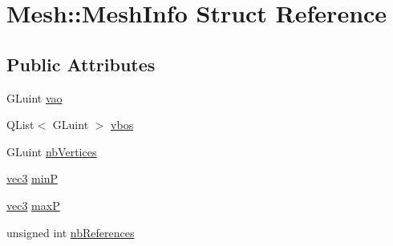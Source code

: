 \hypertarget{struct_mesh_1_1_mesh_info}{\section{Mesh\+:\+:Mesh\+Info Struct Reference}
\label{struct_mesh_1_1_mesh_info}
}
\subsection*{Public Attributes}
\begin{DoxyCompactItemize}
\item 
G\+Luint \hyperlink{struct_mesh_1_1_mesh_info_af15096e0f0aa61fff7d8a1c223e547cf}{vao}
\item 
Q\+List$<$ G\+Luint $>$ \hyperlink{struct_mesh_1_1_mesh_info_ad360b326ff7424dc9b6a3f6614af895d}{vbos}
\item 
G\+Luint \hyperlink{struct_mesh_1_1_mesh_info_a8869e5c769b3895876e32bed8252dffd}{nb\+Vertices}
\item 
\hyperlink{structvec3}{vec3} \hyperlink{struct_mesh_1_1_mesh_info_add150c6f037445254a0ebee99abf3ba9}{min\+P}
\item 
\hyperlink{structvec3}{vec3} \hyperlink{struct_mesh_1_1_mesh_info_a1a3ed73fec39d12cf5fcd1dd554c2dea}{max\+P}
\item 
unsigned int \hyperlink{struct_mesh_1_1_mesh_info_a8e32fc200e5ed8af32c409cac7b17342}{nb\+References}
\end{DoxyCompactItemize}


